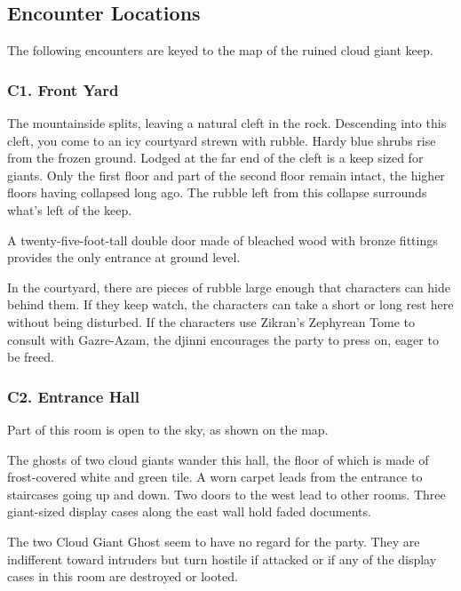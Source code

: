 \documentclass[10pt,a4paper,twoside,bg=print,twocolumn,openany,nodeprecatedcode]{dndbook}
\begin{document}
\subsection{Encounter Locations}
The following encounters are keyed to the map of the ruined cloud giant keep.

\subsubsection{C1. Front Yard}
\begin{DndReadAloud}{}
The mountainside splits, leaving a natural cleft in the rock. Descending into this cleft, you come to an icy courtyard strewn with rubble. Hardy blue shrubs rise from the frozen ground. Lodged at the far end of the cleft is a keep sized for giants. Only the first floor and part of the second floor remain intact, the higher floors having collapsed long ago. The rubble left from this collapse surrounds what's left of the keep.

A twenty-five-foot-tall double door made of bleached wood with bronze fittings provides the only entrance at ground level.

\end{DndReadAloud}

In the courtyard, there are pieces of rubble large enough that characters can hide behind them. If they keep watch, the characters can take a short or long rest here without being disturbed. If the characters use Zikran's Zephyrean Tome to consult with Gazre-Azam, the djinni encourages the party to press on, eager to be freed.

\subsubsection{C2. Entrance Hall}
Part of this room is open to the sky, as shown on the map.

\begin{DndReadAloud}{}
The ghosts of two cloud giants wander this hall, the floor of which is made of frost-covered white and green tile. A worn carpet leads from the entrance to staircases going up and down. Two doors to the west lead to other rooms. Three giant-sized display cases along the east wall hold faded documents.

\end{DndReadAloud}

The two Cloud Giant Ghost seem to have no regard for the party. They are indifferent toward intruders but turn hostile if attacked or if any of the display cases in this room are destroyed or looted.
\end{document}
